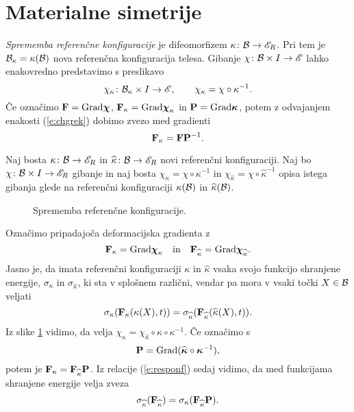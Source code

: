 \section{Materialne simetrije}


\emph{Sprememba referenčne konfiguracije} je difeomorfizem $\kappa\colon\mathcal B\to\mathscr E_R$.
Pri tem je $\mathcal B_{\kappa}=\kappa(\mathcal B)$ nova referenčna konfiguracija telesa. Gibanje
$\chi\colon\mathcal B\times I\to\mathscr E$ lahko enakovredno predstavimo s preslikavo
\begin{equation} \label{e:chgrek}
	\chi_{\kappa}\colon\mathcal B_{\kappa}\times I\to\mathscr E, \qquad
	\chi_{\kappa}=\chi\circ\kappa^{-1}.
\end{equation}
Če označimo $\mathbf F=\mathrm{Grad}\boldsymbol \chi$, $\mathbf F_{\kappa}=\mathrm{Grad}\boldsymbol \chi_{\kappa}$
in $\mathbf P=\mathrm{Grad}\boldsymbol \kappa$, potem z odvajanjem enakosti (\ref{e:chgrek})
dobimo zvezo med gradienti
\[
	\mathbf F_{\kappa}=\mathbf F\mathbf P^{-1}.
\]

Naj bosta $\kappa\colon\mathcal B\to\mathscr E_R$ in $\widehat{\kappa}\colon\mathcal B\to\mathscr E_R$ novi referenčni konfiguraciji.
Naj bo $\chi\colon\mathcal B\times I\to\mathscr E_R$ gibanje in naj bosta
$\chi_{\kappa}=\chi\circ\kappa^{-1}$ in $\chi_{\widehat{\kappa}}=\chi\circ\widehat{\kappa}^{-1}$
opisa istega gibanja glede na referenčni konfiguraciji $\kappa(\mathcal B)$ in $\widehat{\kappa}(\mathcal B)$.
\begin{figure}[h] \begin{center}
	
	\caption{Sprememba referenčne konfiguracije.}
	\label{pic:diagram}
\end{center} \end{figure}
Označimo pripadajoča deformacijska gradienta z
\[
	\mathbf F_{\kappa}=\mathrm{Grad}\boldsymbol \chi_{\kappa}\quad \mathrm{in}\quad
	\mathbf F_{\widehat{\kappa}}=\mathrm{Grad}\boldsymbol \chi_{\widehat{\kappa}}.
\]
Jasno je, da imata referenčni konfiguraciji $\kappa$ in $\widehat{\kappa}$ vsaka
svojo funkcijo shranjene energije, $\sigma_{\kappa}$ in $\sigma_{\widehat{\kappa}}$,
ki sta v splošnem različni, vendar pa mora v vsaki točki $X\in\mathcal B$ veljati
\begin{equation} \label{e:responf}
	\sigma_{\kappa}(\mathbf F_{\kappa}(\kappa(X),t))
	=\sigma_{\widehat{\kappa}}(\mathbf F_{\widehat{\kappa}}(\widehat{\kappa}(X),t)).
\end{equation}
Iz slike \ref{pic:diagram} vidimo, da velja $\chi_{\kappa}=\chi_{\widehat{\kappa}}\circ\widehat{\kappa}\circ\kappa^{-1}$.
Če označimo s
\begin{equation} \label{e:pupa}
	\mathbf P=\mathrm{Grad}(\widehat{\boldsymbol \kappa}\circ\boldsymbol \kappa^{-1}),
\end{equation}
potem je $\mathbf F_{\kappa}=\mathbf F_{\widehat{\kappa}}\mathbf P$. Iz relacije (\ref{e:responf})
sedaj vidimo, da med funkcijama shranjene energije velja zveza
\begin{equation} \label{e:dolgnoc}
	\sigma_{\widehat{\kappa}}(\mathbf F_{\widehat{\kappa}})
	=\sigma_{\kappa}(\mathbf F_{\widehat{\kappa}}\mathbf P).
\end{equation}


